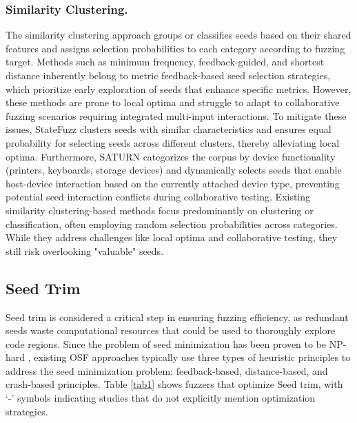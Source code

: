 \subsubsection{Similarity Clustering.}
The similarity clustering approach groups or classifies seeds based on their shared features and assigns selection probabilities to each category according to fuzzing target. Methods such as minimum frequency, feedback-guided, and shortest distance inherently belong to metric feedback-based seed selection strategies, which prioritize early exploration of seeds that enhance specific metrics. However, these methods are prone to local optima and struggle to adapt to collaborative fuzzing scenarios requiring integrated multi-input interactions. To mitigate these issues, StateFuzz \cite{zhao2022statefuzz} clusters seeds with similar characteristics and ensures equal probability for selecting seeds across different clusters, thereby alleviating local optima. Furthermore, SATURN \cite{Xu2024Saturn} categorizes the corpus by device functionality (\eg printers, keyboards, storage devices) and dynamically selects seeds that enable host-device interaction based on the currently attached device type, preventing potential seed interaction conflicts during collaborative testing. Existing similarity clustering-based methods focus predominantly on clustering or classification, often employing random selection probabilities across categories. While they address challenges like local optima and collaborative testing, they still risk overlooking "valuable" seeds. 

\subsection{Seed Trim}
 Seed trim is considered a critical step in ensuring fuzzing efficiency, as redundant seeds waste computational resources that could be used to thoroughly explore code regions. Since the problem of seed minimization has been proven to be NP-hard \cite{Rebert2014OptimizingSS}, existing OSF approaches typically use three types of heuristic principles to address the seed minimization problem: feedback-based, distance-based, and crash-based principles. Table \ref{tab1} shows fuzzers that optimize Seed trim, with `-' symbols indicating studies that do not explicitly mention optimization strategies.

